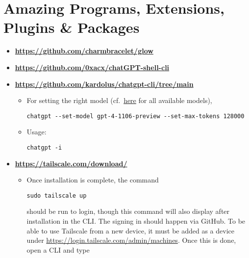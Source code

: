\documentclass[12pt, a4paper]{article}
\numberwithin{equation}{section}
\theoremstyle{definition}
\theoremstyle{definition}
\begin{document}
\newpage 

\section{Amazing Programs, Extensions, Plugins \& Packages}

	\begin{itemize}
		\item \textbf{\url{https://github.com/charmbracelet/glow}}
		
		\item \textbf{\url{https://github.com/0xacx/chatGPT-shell-cli}}
		
		\item \textbf{\url{https://github.com/kardolus/chatgpt-cli/tree/main}}	
		
		\begin{itemize}
			\item For setting the right model (cf.~\href{https://platform.openai.com/docs/models/gpt-4-and-gpt-4-turbo}{here} for all available models), 
			
			\begin{lstlisting}[style=mystylebash, label=alg:chatgpt_set_model, xleftmargin=\parindent]
				chatgpt --set-model gpt-4-1106-preview --set-max-tokens 128000
			\end{lstlisting}

			\item Usage:

			\begin{lstlisting}[style=mystylebash, label=alg:chatgpt_usage, xleftmargin=\parindent]
				chatgpt -i
			\end{lstlisting}
		\end{itemize}

		\item \textbf{\url{https://tailscale.com/download/}}
		
		\begin{itemize}
			\item Once installation is complete, the command 
			
			\begin{lstlisting}[style=mystylepython, label=alg:tailscale_login, xleftmargin=\parindent]
				sudo tailscale up
			\end{lstlisting}
		
			should be run to login, though this command will also display after installation in the CLI. The signing in should happen via GitHub. To be able to use Tailscale from a new device, it must be added as a device under \url{https://login.tailscale.com/admin/machines}. Once this is done, open a CLI and type 
			

\end{itemize}
\end{itemize}
\end{document}
